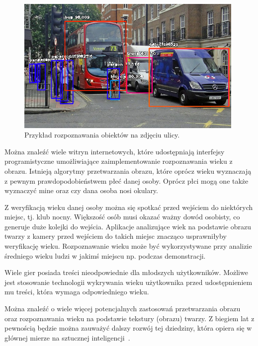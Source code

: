 \documentclass[a4paper,twoside,12pt]{book}
\begin{document}
    \begin{figure}
        \centering
        \includegraphics[width=11cm]{Obrazy/rozpoznawanieObiektow.jpeg}
        \caption{Przykład rozpoznawania obiektów na zdjęciu ulicy.~\cite{rozpoznawanieObiektow}}
        \label{fig.rozpoznawanieObiektow}
    \end{figure}

    Można znaleźć wiele witryn internetowych, które udostępniają interfejsy programistyczne umożliwiające zaimplementowanie
    rozpoznawania wieku z obrazu.
    Istnieją algorytmy przetwarzania obrazu, które oprócz wieku wyznaczają z pewnym prawdopodobieństwem płeć danej osoby.
    Oprócz płci mogą one także wyznaczyć mine oraz czy dana osoba nosi okulary.

    Z weryfikacją wieku danej osoby można się spotkać przed wejściem do niektórych miejsc, tj.
    klub nocny.
    Większość osób
    musi okazać ważny dowód osobisty,
    co generuje duże kolejki do wejścia.
    Aplikacje analizujące wiek na podstawie obrazu twarzy z kamery przed wejściem
    do takich miejsc znacząco usprawniłyby weryfikację wieku.
    Rozpoznawanie wieku może być wykorzystywane przy analizie średniego wieku ludzi w jakimś miejscu np.
    podczas demonstracji.

    Wiele gier posiada treści nieodpowiednie dla młodszych użytkowników.
    Możliwe jest stosowanie technologii wykrywania
    wieku użytkownika przed udostępnieniem mu treści, która wymaga odpowiedniego wieku.

    Można znaleźć o wiele więcej potencjalnych zastosowań przetwarzania obrazu oraz rozpoznawania wieku na podstawie
    tekstury (obrazu) twarzy.
    Z biegiem lat z pewnością będzie można zauważyć dalszy rozwój tej dziedziny, która
    opiera się w głównej mierze na sztucznej inteligencji~\cite{computerVision}.
\end{document}
